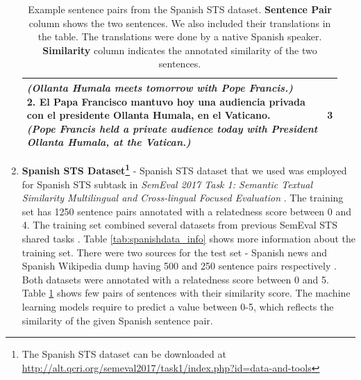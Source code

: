 \begin{enumerate}
\begin{table}[ht!]
\begin{tabular}{l|c}
{			\textit{(Ollanta Humala meets tomorrow with Pope Francis.)} \\ 
			2. El Papa Francisco mantuvo hoy una audiencia privada \\ con el presidente Ollanta Humala, en el Vaticano. \\
			\textit{(Pope Francis held a private audience today with President} \\ \textit{Ollanta Humala, at the Vatican.)}} & 3  \\
		\hline               
	\end{tabular}
	\caption[Example sentence pairs from the Spanish STS dataset]{Example sentence pairs from the Spanish STS dataset. \textbf{Sentence Pair} column shows the two sentences. We also included their translations in the table. The translations were done by a native Spanish speaker. \textbf{Similarity} column indicates the annotated similarity of the two sentences. }
	\label{tab:spanishdata}
\end{table} 
	

\item{ \textbf{Spanish STS Dataset\footnote{The Spanish STS dataset can be downloaded at \url{http://alt.qcri.org/semeval2017/task1/index.php?id=data-and-tools}}}} - Spanish STS dataset that we used was employed for Spanish STS subtask in \textit{SemEval 2017 Task 1: Semantic Textual Similarity Multilingual and Cross-lingual Focused Evaluation} \autocite{cer-etal-2017-semeval}. The training set has 1250 sentence pairs annotated with a relatedness score between 0 and 4. The training set combined several datasets from previous SemEval STS shared tasks \autocite{cer-etal-2017-semeval}. Table \ref{tab:spanishdata_info} shows more information about the training set. There were two sources for the test set - Spanish news and Spanish Wikipedia dump having 500 and 250 sentence pairs respectively \autocite{cer-etal-2017-semeval}. Both datasets were annotated with a relatedness score between 0 and 5. Table \ref{tab:spanishdata} shows few pairs of sentences with their similarity score. The machine learning models require to predict a value between 0-5, which reflects the similarity of the given Spanish sentence pair.



\end{enumerate}
